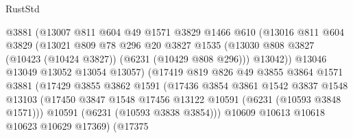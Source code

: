 \begin{lexlean}{RustStd}
\begin{coremodule}
{{                            @3881
                            (@13007
                              @811
                              @604
                              @49
                              @1571
                              @3829
                              @1466
                              @610
                              (@13016
                                @811
                                @604
                                @3829
                                (@13021
                                  @809
                                  @78
                                  @296
                                  @20
                                  @3827
                                  @1535
                                  (@13030
                                    @808
                                    @3827
                                    (@10423 (@10424 @3827))
                                    (@6231 (@10429 @808 @296)))
                                  @13042))
                              @13046
                              @13049
                              @13052
                              @13054
                              @13057)
                            (@17419
                              @819
                              @826
                              @49
                              @3855
                              @3864
                              @1571
                              @3881
                              (@17429
                                @3855
                                @3862
                                @1591
                                (@17436
                                  @3854
                                  @3861
                                  @1542
                                  @3837
                                  @1548
                                  @13103
                                  (@17450
                                    @3847
                                    @1548
                                    @17456
                                    @13122
                                    @10591
                                    (@6231 (@10593 @3848 @1571)))
                                  @10591
                                  (@6231 (@10593 @3838 @3854)))
                                @10609
                                @10613
                                @10618
                                @10623
                                @10629
                                @17369)
                              (@17375
}}
\end{coremodule}
\end{lexlean}
